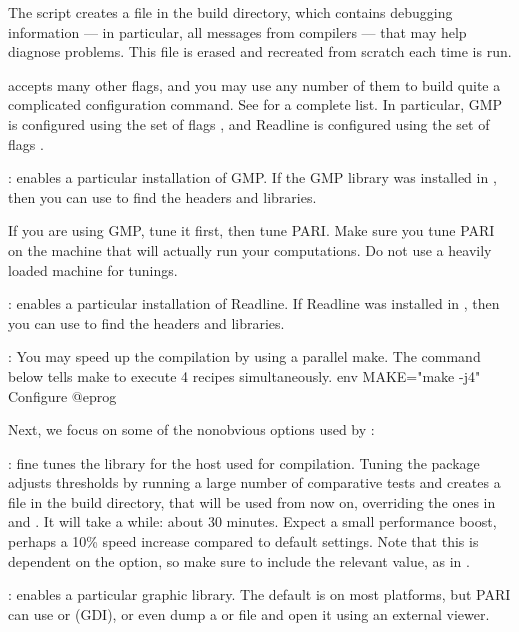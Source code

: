 The  script creates a file  in the build
directory, which contains debugging information --- in particular, all
messages from compilers ---  that may help diagnose problems. This file
is erased and recreated from scratch each time  is run.

 accepts many other flags, and you may use any number of them
to build quite a complicated configuration command. See  for a complete list. In particular, GMP is configured using the set
of flags , and Readline is configured using the set
of flags .

: enables a particular installation of GMP. If the GMP
library was installed in , then you can use
 to find the headers and libraries.

If you are using GMP, tune it first, then tune PARI. Make sure you tune PARI
on the machine that will actually run your computations. Do not use a heavily
loaded machine for tunings.

: enables a particular installation of Readline. If
Readline was installed in , then you can use
 to find the headers and libraries.

: You may speed up the compilation by using a parallel make.
The command below tells make to execute 4 recipes simultaneously.
\bprog
  env MAKE="make -j4" Configure
@eprog

Next, we focus on some of the nonobvious options used by :

: fine tunes the library for the host used for compilation.
Tuning the package adjusts thresholds by running a large number of comparative
tests and creates a file  in the build directory, that will be
used from now on, overriding the ones in  and
. It will take a while: about 30 minutes. Expect a small
performance boost, perhaps a 10\% speed increase compared to default settings.
Note that this is dependent on the  option, so make sure to include
the relevant value, as in .

: enables a particular graphic library.
The default is  on most platforms, but PARI can use
 or  (GDI), or even dump a 
or  file and open it using an external viewer.

